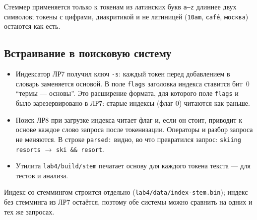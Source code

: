 Стеммер применяется только к токенам из латинских букв \texttt{a--z} длиннее двух символов; токены с цифрами, диакритикой и не латиницей (\texttt{10am}, \texttt{café}, \texttt{москва}) остаются как есть.

\subsection{Встраивание в поисковую систему}
\begin{itemize}
    \item Индексатор ЛР7 получил ключ \texttt{-s}: каждый токен перед добавлением в словарь заменяется основой. В поле \texttt{flags} заголовка индекса ставится бит~0 \enquote{термы --- основы}. Это расширение формата, для которого поле \texttt{flags} и было зарезервировано в ЛР7: старые индексы (флаг 0) читаются как раньше.
    \item Поиск ЛР8 при загрузке индекса читает флаг и, если он стоит, приводит к основе каждое слово запроса после токенизации. Операторы и разбор запроса не меняются. В строке \texttt{parsed:} видно, во что превратился запрос: \texttt{skiing resorts} $\to$ \texttt{ski \&\& resort}.
    \item Утилита \texttt{lab4/build/stem} печатает основу для каждого токена текста --- для тестов и анализа.
\end{itemize}
Индекс со стеммингом строится отдельно (\texttt{lab4/data/index-stem.bin}); индекс без стемминга из ЛР7 остаётся, поэтому обе системы можно сравнить на одних и тех же запросах.

